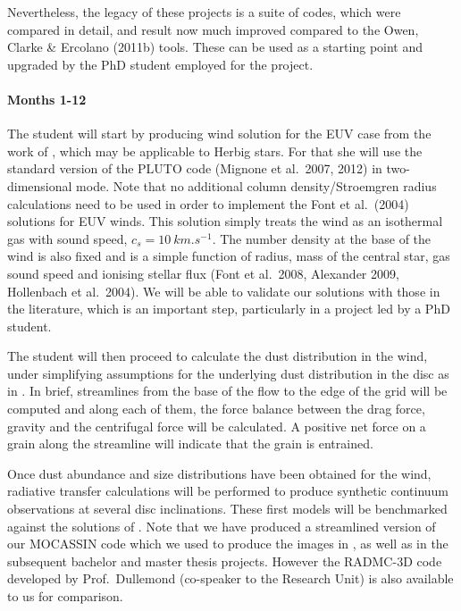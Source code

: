 \documentclass[10pt,fleqn,twoside]{article}
\begin{document}
 Nevertheless, the legacy of these projects is a suite of
codes, which were compared in detail, and result now much improved
compared to the Owen, Clarke \& Ercolano (2011b) tools. These can be
used as a starting point and upgraded by the PhD student employed for the project.  


\paragraph{Months 1-12}

The student will start by producing wind solution for the EUV case
from the work of \citet{2004ApJ...607..890F}, which may be applicable
to Herbig stars. For that she will use the standard version of the
PLUTO code (Mignone et al.\ 2007, 2012) in
two-dimensional mode. Note that no additional column density/Stroemgren radius
calculations need to be used in order to implement the Font et
al.\ (2004) solutions for EUV winds. This solution simply treats the
wind as an isothermal gas with sound speed, $c_s =
\SI{10}{km.s^{-1}}$.
The number density at the base of the wind is also fixed and is a simple
function of radius, mass of the central star, gas sound speed and
ionising stellar flux (Font et al.\ 2008, Alexander 2009, Hollenbach et
al.\ 2004). We will be able to validate our solutions with those in the
literature, which is an important step, particularly in a project led
by a PhD student. 

The student will then proceed to calculate the dust
distribution in the wind, under simplifying assumptions for the
underlying dust distribution in the disc as in \citet{2011MNRAS.411.1104O}. In
brief, streamlines from the base of the flow to the edge of the grid
will be computed and along each of them, the force balance between the
drag force, gravity and the centrifugal force will be calculated. A
positive net force on a grain along the streamline will indicate that
the grain is entrained.

Once dust abundance and size distributions have been obtained for the
wind, radiative transfer calculations will be performed to produce
synthetic continuum observations at several disc inclinations. 
These first models will be benchmarked against the solutions
of \citet{2011MNRAS.411.1104O}. Note that we have produced a
streamlined version of our MOCASSIN code which we used to produce the
images in \citet{2011MNRAS.411.1104O}, as well as in the subsequent
bachelor and master thesis projects. However the RADMC-3D code
developed by Prof.\ Dullemond (co-speaker to the Research Unit) is also
available to us for comparison. 
\end{document}
